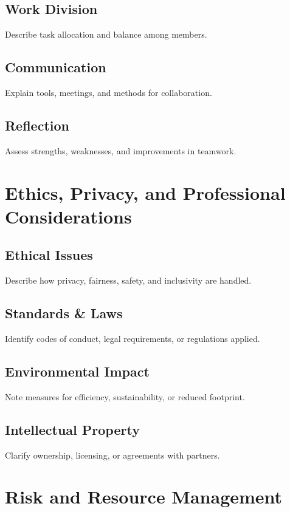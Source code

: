 \documentclass[12pt]{article}
\begin{document}
\subsection{Work Division}
Describe task allocation and balance among members.

\subsection{Communication}
Explain tools, meetings, and methods for collaboration.

\subsection{Reflection}
Assess strengths, weaknesses, and improvements in teamwork.

\section{Ethics, Privacy, and Professional Considerations}

\subsection{Ethical Issues}
Describe how privacy, fairness, safety, and inclusivity are handled.

\subsection{Standards \& Laws}
Identify codes of conduct, legal requirements, or regulations applied.

\subsection{Environmental Impact}
Note measures for efficiency, sustainability, or reduced footprint.

\subsection{Intellectual Property}
Clarify ownership, licensing, or agreements with partners.

\section{Risk and Resource Management}
\end{document}
